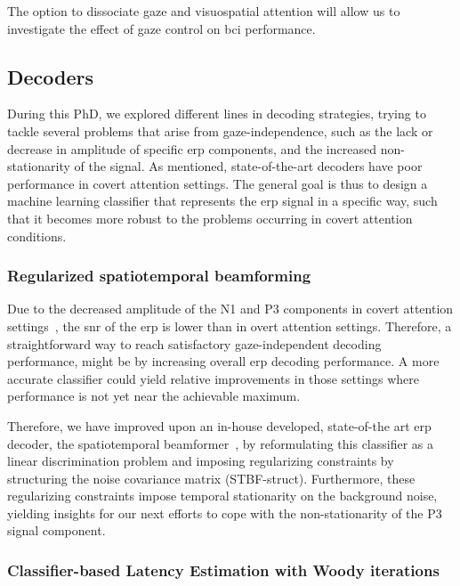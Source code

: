 The option to dissociate gaze and visuospatial attention will allow us to
investigate the effect of gaze control on \ac{bci} performance.

\subsection{Decoders}

During this PhD, we explored different lines in decoding strategies,
trying to tackle several problems that arise from gaze-independence, such as
the lack or decrease in amplitude of specific \ac{erp} components, and the increased
non-stationarity of the signal.
As mentioned, state-of-the-art decoders have poor performance in covert attention
settings.
The general goal is thus to design a machine learning classifier that represents
the \ac{erp} signal in a specific way, such that it becomes more robust to the problems
occurring in covert attention conditions.

\subsubsection{Regularized spatiotemporal beamforming}
Due to the decreased amplitude of the N1 and P3 components in covert attention
settings~\cite{Treder2010}, the \ac{snr} of
the \ac{erp} is lower than in overt attention settings.
Therefore, a straightforward way to reach satisfactory
gaze-independent decoding performance, might be by increasing overall \ac{erp}
decoding performance. A more accurate classifier could yield relative
improvements in those settings where performance is not yet near the achievable
maximum.

Therefore, we have improved upon an in-house developed, state-of-the art \ac{erp}
decoder, the spatiotemporal beamformer~\cite{Wittevrongel2016}, by reformulating
this classifier as a linear discrimination problem and
imposing regularizing constraints by structuring the noise covariance matrix
(STBF-struct).
Furthermore, these regularizing constraints impose temporal stationarity on
the background noise, yielding insights for our next
efforts to cope with the non-stationarity of the P3 signal component.

\subsubsection{Classifier-based Latency Estimation with Woody iterations}

